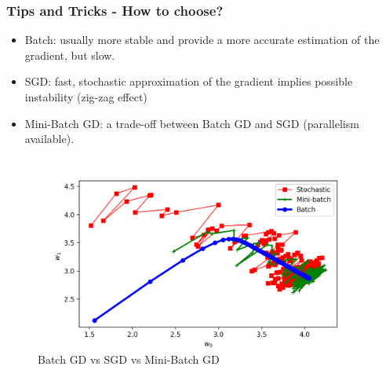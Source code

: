 \documentclass{beamer}
\begin{document}
	\begin{frame}
		\frametitle{Tips and Tricks - How to choose?}
		\begin{itemize}
			\item Batch: usually more stable and provide a more accurate estimation of the gradient, but slow.
			\item SGD: fast, stochastic approximation of the gradient implies possible instability (zig-zag effect)
			\item Mini-Batch GD: a trade-off between Batch GD and SGD (parallelism available).
		\end{itemize}
		\begin{figure}
			\centering
			\includegraphics[scale=0.42]{images/gd_mb_sgd}
			\caption{Batch GD vs SGD vs Mini-Batch GD}
		\end{figure}
	
	\end{frame}
\end{document}
